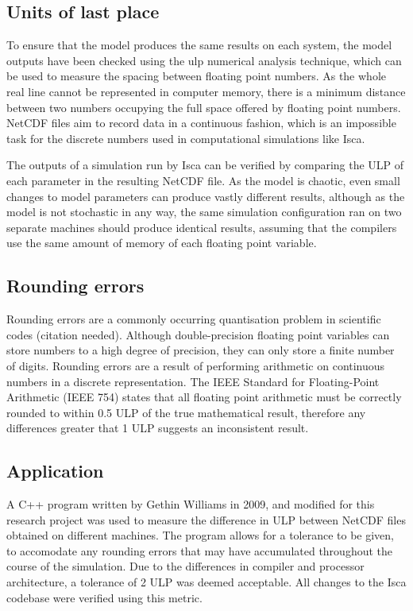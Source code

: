 \documentclass[a4paper,11pt]{report}
\begin{document}
\subsection{Units of last place}
To ensure that the model produces the same results on each system, the model outputs have been checked using the \gls{ulp} numerical analysis technique, which can be used to measure the spacing between floating point numbers. As the whole real line cannot be represented in computer memory, there is a minimum distance between two numbers occupying the full space offered by floating point numbers. NetCDF files aim to record data in a continuous fashion, which is an impossible task for the discrete numbers used in computational simulations like Isca.
\par
The outputs of a simulation run by Isca can be verified by comparing the ULP of each parameter in the resulting NetCDF file. As the model is chaotic, even small changes to model parameters can produce vastly different results, although as the model is not stochastic in any way, the same simulation configuration ran on two separate machines should produce identical results, assuming that the compilers use the same amount of memory of each floating point variable. 

\subsection{Rounding errors}
Rounding errors are a commonly occurring quantisation problem in scientific codes (citation needed). Although double-precision floating point variables can store numbers to a high degree of precision, they can only store a finite number of digits. Rounding errors are a result of performing arithmetic on continuous numbers in a discrete representation. The IEEE Standard for Floating-Point Arithmetic (IEEE 754) states that all floating point arithmetic must be correctly rounded to within 0.5 ULP of the true mathematical result, therefore any differences greater that 1 ULP suggests an inconsistent result. 

\subsection{Application}
A C++ program written by Gethin Williams in 2009, and modified for this research project was used to measure the difference in ULP between NetCDF files obtained on different machines. The program allows for a tolerance to be given, to accomodate any rounding errors that may have accumulated throughout the course of the simulation. Due to the differences in compiler and processor architecture, a tolerance of 2 ULP was deemed acceptable. All changes to the Isca codebase were verified using this metric.
\par
\end{document}
